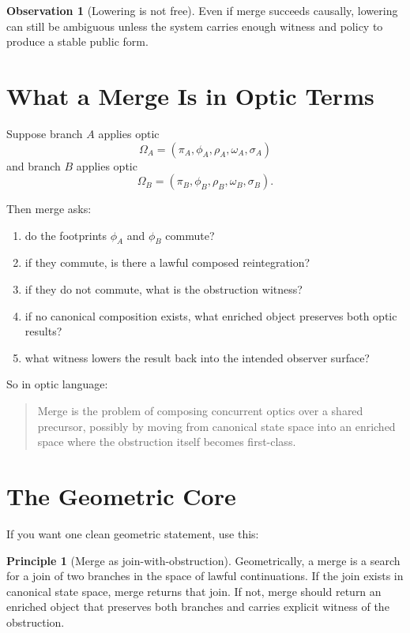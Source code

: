 \documentclass[11pt]{article}
\theoremstyle{definition}
\newtheorem{observation}{Observation}
\newtheorem{principle}{Principle}
\begin{document}
\begin{observation}[Lowering is not free]
Even if merge succeeds causally, lowering can still be ambiguous unless the
system carries enough witness and policy to produce a stable public form.
\end{observation}

\section{What a Merge Is in Optic Terms}

Suppose branch $A$ applies optic
\[
\Omega_A = (\pi_A,\phi_A,\rho_A,\omega_A,\sigma_A)
\]
and branch $B$ applies optic
\[
\Omega_B = (\pi_B,\phi_B,\rho_B,\omega_B,\sigma_B).
\]

Then merge asks:
\begin{enumerate}[leftmargin=2em]
\item do the footprints $\phi_A$ and $\phi_B$ commute?
\item if they commute, is there a lawful composed reintegration?
\item if they do not commute, what is the obstruction witness?
\item if no canonical composition exists, what enriched object preserves both
  optic results?
\item what witness lowers the result back into the intended observer surface?
\end{enumerate}

So in optic language:

\begin{quote}
Merge is the problem of composing concurrent optics over a shared precursor,
possibly by moving from canonical state space into an enriched space where the
obstruction itself becomes first-class.
\end{quote}

\section{The Geometric Core}

If you want one clean geometric statement, use this:

\begin{principle}[Merge as join-with-obstruction]
Geometrically, a merge is a search for a join of two branches in the space of
lawful continuations. If the join exists in canonical state space, merge
returns that join. If not, merge should return an enriched object that
preserves both branches and carries explicit witness of the obstruction.
\end{principle}
\end{document}
